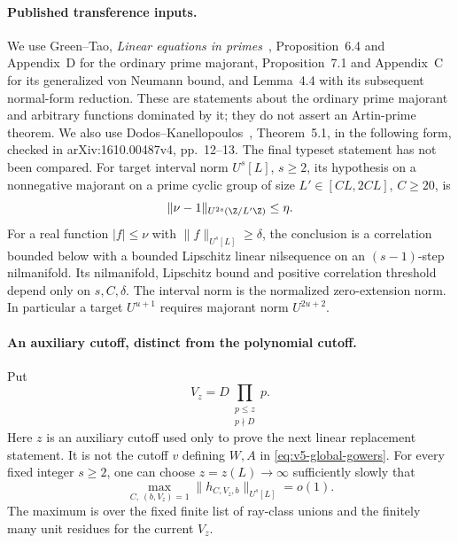 \paragraph{Published transference inputs.}
We use Green--Tao, \emph{Linear equations in primes}~\cite{greentao},
Proposition~6.4 and Appendix~D for the ordinary prime majorant,
Proposition~7.1 and Appendix~C for its generalized von Neumann bound,
and Lemma~4.4 with its subsequent normal-form reduction.
These are statements about the ordinary prime majorant and arbitrary
functions dominated by it; they do not assert an Artin-prime theorem.
We also use Dodos--Kanellopoulos~\cite{v5dk}, Theorem~5.1, in the
following form, checked in arXiv:1610.00487v4, pp.~12--13. The final
typeset statement has not been compared. For target interval norm $U^s[L]$, $s\geq2$, its hypothesis on a
nonnegative majorant on a prime cyclic group of size
$L'\in[CL,2CL]$, $C\geq20$, is
\begin{equation}\label{eq:gaussian-dk-correct-exponent}
 \|\nu-1\|_{U^{2s}(\Z/L'\Z)}\leq\eta.
\end{equation}
For a real function $|f|\leq\nu$ with $\|f\|_{U^s[L]}\geq\delta$,
the conclusion is a correlation bounded below with a bounded Lipschitz
linear nilsequence on an $(s-1)$-step nilmanifold. Its nilmanifold,
Lipschitz bound and positive correlation threshold depend only on
$s,C,\delta$. The interval norm is the normalized zero-extension norm.
In particular a target $U^{u+1}$ requires majorant norm $U^{2u+2}$.

\paragraph{An auxiliary cutoff, distinct from the polynomial cutoff.}
Put
\[
 V_z=D\prod_{\substack{p\leq z\\p\nmid D}}p.
\]
Here $z$ is an auxiliary cutoff used only to prove the next linear
replacement statement. It is not the cutoff $v$ defining $W,A$ in
\eqref{eq:v5-global-gowers}.
For every fixed integer $s\geq2$, one can choose $z=z(L)\to\infty$
sufficiently slowly that
\begin{equation}\label{eq:gaussian-refined-gowers}
 \max_{C,\ (b,V_z)=1}\|h_{C,V_z,b}\|_{U^s[L]}=o(1).
\end{equation}
The maximum is over the fixed finite list of ray-class unions and the
finitely many unit residues for the current $V_z$.

